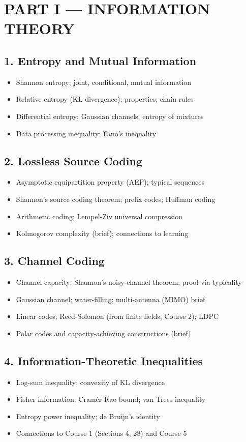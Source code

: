 \section{PART I --- INFORMATION THEORY}

\subsection{1. Entropy and Mutual Information}
\begin{itemize}
\item Shannon entropy; joint, conditional, mutual information
\item Relative entropy (KL divergence); properties; chain rules
\item Differential entropy; Gaussian channels; entropy of mixtures
\item Data processing inequality; Fano's inequality
\end{itemize}

\subsection{2. Lossless Source Coding}
\begin{itemize}
\item Asymptotic equipartition property (AEP); typical sequences
\item Shannon's source coding theorem; prefix codes; Huffman coding
\item Arithmetic coding; Lempel-Ziv universal compression
\item Kolmogorov complexity (brief); connections to learning
\end{itemize}

\subsection{3. Channel Coding}
\begin{itemize}
\item Channel capacity; Shannon's noisy-channel theorem; proof via typicality
\item Gaussian channel; water-filling; multi-antenna (MIMO) brief
\item Linear codes; Reed-Solomon (from finite fields, Course 2); LDPC
\item Polar codes and capacity-achieving constructions (brief)
\end{itemize}

\subsection{4. Information-Theoretic Inequalities}
\begin{itemize}
\item Log-sum inequality; convexity of KL divergence
\item Fisher information; Cram\'er-Rao bound; van Trees inequality
\item Entropy power inequality; de Bruijn's identity
\item Connections to Course 1 (Sections 4, 28) and Course 5
\end{itemize}

